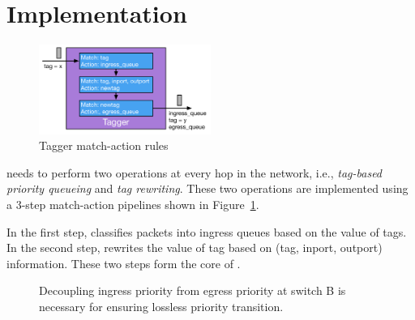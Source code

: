 \section{Implementation}\label{sec:implementation}

\begin{figure}
	\hspace{-0.2in}
	\centering
	\includegraphics[width=0.5\textwidth] {figs/Tagger}
	\caption{Tagger match-action rules}\label{fig:tagger}
	
\end{figure}

\sysname{} needs to perform two operations at every hop in the network, i.e.,
{\em tag-based priority queueing} and {\em tag rewriting}.  These two operations
are implemented using a 3-step match-action pipelines shown in
Figure~\ref{fig:tagger}.
 
In the first step, \sysname{} classifies packets into ingress queues based on
the value of tags. In the second step, \sysname{} rewrites the value of tag
based on (tag, inport, outport) information. These two steps form the core of
\sysname{}.
 
\begin{figure}[t]
 	\centering

 	\caption{Decoupling ingress priority from egress priority at switch B is necessary for ensuring lossless priority transition.}\label{fig:prioritydecoupling}
\end{figure}

